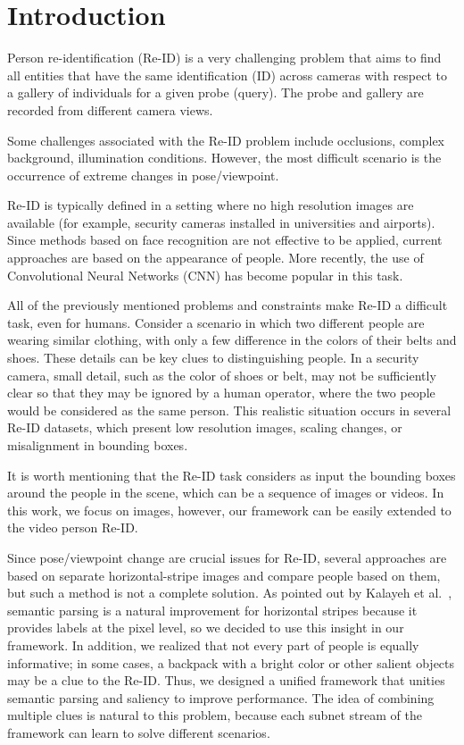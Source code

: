 \documentclass[final,3p,times,twocolumn]{elsarticle}
\begin{document}
\section{Introduction}
\label{sec:intro}

Person re-identification (Re-ID) is a very challenging problem that aims to find all entities that have the same identification (ID) across cameras with respect to a gallery of individuals for a given probe (query). The probe and gallery are recorded from different camera views.

Some challenges associated with the Re-ID problem include occlusions, complex background, illumination conditions. However, the most difficult scenario is the occurrence of extreme changes in pose/viewpoint.

Re-ID is typically defined in a setting where no high resolution images are available (for example, security cameras installed in universities and airports). Since methods based on face recognition are not effective to be applied, current approaches are based on the appearance of people. More recently, the use of Convolutional Neural Networks (CNN) has become popular in this task.

All of the previously mentioned problems and constraints make Re-ID a difficult task, even for humans. Consider a scenario in which two different people are wearing similar clothing, with only a few difference in the colors of their belts and shoes. These details can be key clues to distinguishing people. In a security camera, small detail, such as the color of shoes or belt, may not be sufficiently clear so that they may be ignored by a human operator, where the two people would be considered as the same person. This realistic situation occurs in several Re-ID datasets, which present low resolution images, scaling changes, or misalignment in bounding boxes.

It is worth mentioning that the Re-ID task considers as input the bounding boxes around the people in the scene, which can be a sequence of images or videos. In this work, we focus on images, however, our framework can be easily extended to the video person Re-ID.

Since pose/viewpoint change are crucial issues for Re-ID, several approaches are based on separate horizontal-stripe images and compare people based on them, but such a method is not a complete solution. As pointed out by Kalayeh et al.~\cite{kalayeh2018human}, semantic parsing is a natural improvement for horizontal stripes because it provides labels at the pixel level, so we decided to use this insight in our framework. In addition, we realized that not every part of people is equally informative; in some cases, a backpack with a bright color or other salient objects may be a clue to the Re-ID. Thus, we designed a unified framework that unities semantic parsing and saliency to improve performance. The idea of combining multiple clues is natural to this problem, because each subnet stream of the framework can learn to solve different scenarios.
\end{document}
